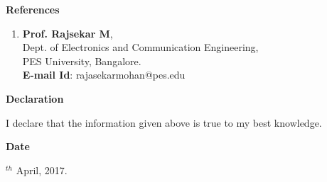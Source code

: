 \documentclass[a4paper,12pt,final]{memoir}
\newcommand{\Sep}{\vspace{1.5em}}
\newcommand{\SmallSep}{\vspace{0.5em}}
\newcommand{\CVSection}[1]
{\Large\textbf{#1}\par
	\SmallSep\normalsize\normalfont}
\begin{document}
	\CVSection{References}
		\begin{enumerate}
			\item \textbf{Prof. Rajsekar M},\\
			 Dept. of Electronics and Communication Engineering,\\ PES University, Bangalore.\\
			\textbf{E-mail Id}: rajasekarmohan@pes.edu 
		\end{enumerate}
	\Sep
	\clearpage
	\framebreak
	\framebreak
		
	\CVSection{Declaration}
		I declare that the information given above is true to my best knowledge.
	\Sep
	
	\CVSection{Date}
		24$^{th}$ April, 2017.
	\Sep

	
\end{document}
